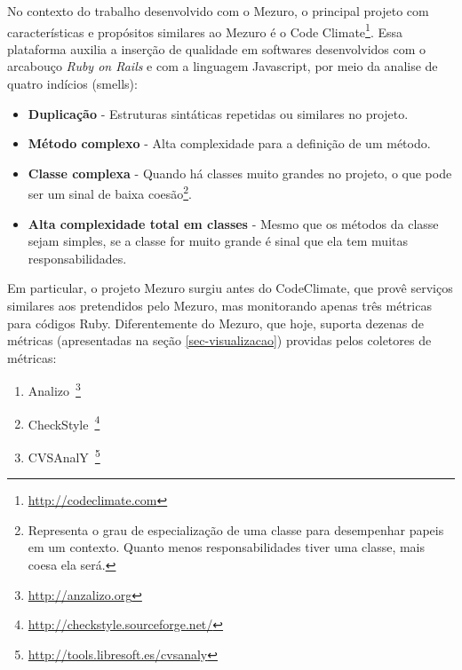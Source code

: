 

No contexto do trabalho desenvolvido com o Mezuro, o principal projeto com características e propósitos similares ao Mezuro é o Code Climate\footnote{\url{http://codeclimate.com}}. Essa plataforma auxilia a inserção de qualidade em softwares desenvolvidos com o arcabouço \textit{Ruby on Rails} e com a linguagem Javascript, por meio da analise de quatro indícios (smells): 

	\begin{itemize}
	\item \textbf{Duplicação} - Estruturas sintáticas repetidas ou similares no projeto.
	\item \textbf{Método complexo} - Alta complexidade para a definição de um método.
	\item \textbf{Classe complexa} - Quando há classes muito grandes no projeto, o que pode ser um sinal de baixa coesão\footnote{Representa o grau de especialização de uma classe para desempenhar papeis em um contexto. Quanto menos responsabilidades tiver uma classe, mais coesa ela será.}.
	\item \textbf{Alta complexidade total em classes} - Mesmo que os métodos da classe sejam simples, se a classe for muito grande é sinal que ela tem muitas responsabilidades.
	\end{itemize}
    
Em particular, o projeto Mezuro surgiu antes do CodeClimate, que provê serviços similares aos pretendidos pelo Mezuro, mas monitorando apenas três métricas para códigos Ruby. Diferentemente do Mezuro, que hoje, suporta dezenas de métricas (apresentadas na seção \ref{sec-visualizacao}) providas pelos coletores de métricas:
%
\begin{enumerate}
\item Analizo~\footnote{\url{http://anzalizo.org}}
\item CheckStyle~\footnote{\url{http://checkstyle.sourceforge.net/}} 
\item CVSAnalY~\footnote{\url{http://tools.libresoft.es/cvsanaly}}
\end{enumerate}

